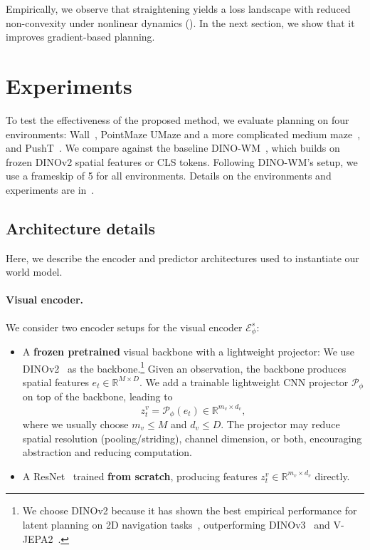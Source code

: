 Empirically, we observe that straightening yields a loss landscape with reduced non-convexity under nonlinear dynamics (). In the next section, we show that it improves gradient-based planning.


\section{Experiments}


To test the effectiveness of the proposed method, we evaluate planning on four environments: Wall~\citep{dinowm, sobal2025learning}, PointMaze UMaze and a more complicated medium maze~\citep{fu2020d4rl}, and PushT~\citep{chi2024pusht}. We compare against the baseline DINO-WM~\citep{dinowm}, which builds on frozen DINOv2 spatial features or CLS tokens. Following DINO-WM's setup, we use a frameskip of 5 for all environments. Details on the environments and experiments are in~.


\subsection{Architecture details}
\label{subsec:architecture-details}

Here, we describe the encoder and predictor architectures used to instantiate our world model.


\paragraph{Visual encoder.}
We consider two encoder setups for the visual encoder $\mathcal{E}^s_\phi$:
\begin{itemize}
    \item A \textbf{frozen pretrained} visual backbone with a lightweight projector: We use DINOv2~\citep{oquab2024dinov2} as the backbone.\footnote{We choose DINOv2 because it has shown the best empirical performance for latent planning on 2D navigation tasks~\citep{terver2026drivessuccessphysicalplanning}, outperforming DINOv3~\citep{dinov3} and V-JEPA2~\citep{assran2025vjepa2selfsupervisedvideo}.} Given an observation, the backbone produces spatial features $e_t \in \mathbb{R}^{M \times D}$. We add a trainable lightweight CNN projector $\mathcal{P}_\phi$ on top of the backbone, leading to
    \begin{equation}
    z_t^v = \mathcal{P}_\phi(e_t) \in \mathbb{R}^{m_v \times d_v},
    \end{equation}
    where we usually choose $m_v \le M$ and $d_v \le D$. The projector may reduce spatial resolution (pooling/striding), channel dimension, or both, encouraging abstraction and reducing computation.
    \item A ResNet~\citep{He2015DeepRL} trained \textbf{from scratch}, producing features $z_t^v \in \mathbb{R}^{m_v \times d_v}$ directly.
 \end{itemize}

